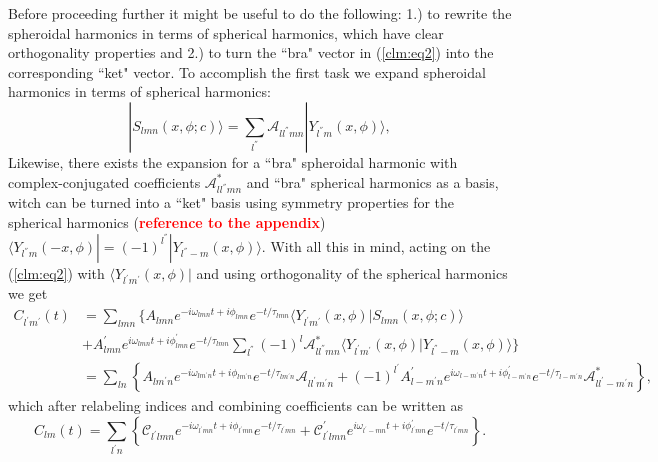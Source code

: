 \documentclass[10pt]{article}
\newcommand{\bra}[1]{\langle #1|}
\newcommand{\ket}[1]{|#1\rangle}
\newcommand{\braket}[2]{\langle #1|#2\rangle}
\begin{document}
\noindent
Before proceeding further it might be useful to do the following: 1.) to rewrite the spheroidal harmonics in terms of spherical harmonics, which have clear orthogonality properties and 2.) to turn the ``bra" vector in (\ref{clm:eq2}) into the corresponding ``ket" vector. To accomplish the first task we expand spheroidal harmonics in terms of spherical harmonics:
\begin{equation}
\ket{S_{lmn}(x, \phi ;c)} = \sum_{l^{''}} \mathcal{A}_{ll^{''}mn} \ket{Y_{l^{''}m}(x, \phi)},
\end{equation}
\noindent
Likewise, there exists the expansion for a ``bra" spheroidal harmonic with complex-conjugated coefficients $\mathcal{A}^{*}_{ll^{''}mn}$ and ``bra" spherical harmonics as a basis, witch can be turned into a ``ket" basis using symmetry properties for the spherical harmonics (\textcolor{red}{\bf reference to the appendix}) $\bra{Y_{l^{''}m}(-x, \phi)} = (-1)^{l^{''}} \ket{Y_{l^{''}-m}(x, \phi)}$. With all this in mind, acting on the (\ref{clm:eq2}) with $\bra{Y_{l^{'}m^{'}}(x, \phi)}$ and using orthogonality of the spherical harmonics we get
\begin{equation}
\begin{aligned} \label{clm:eq3}
C_{l^{'}m^{'}}(t) & = \sum_{lmn} \bigg\{ A_{lmn} e^{-i\omega_{lmn}t+i\phi_{lmn}}e^{-t/\tau_{lmn}} \braket{Y_{l^{'}m^{'}}(x, \phi)}{S_{lmn}(x, \phi ;c)}\\
&+ A^{'}_{lmn} e^{i\omega_{lmn}t+i\phi^{'}_{lmn}}e^{-t/\tau_{lmn}} \sum_{l^{''}} (-1)^l \mathcal{A}^{*}_{ll^{''}mn} \braket{Y_{l^{'}m^{'}}(x, \phi)}{Y_{l^{''}-m}(x, \phi)} \bigg\}\\
& = \sum_{ln} \left \{ A_{lm^{'}n} e^{-i\omega_{lm^{'}n}t+i\phi_{lm^{'}n}}e^{-t/\tau_{lm^{'}n}} \mathcal{A}_{ll^{'}m^{'}n} + (-1)^{l^{'}} A^{'}_{l-m^{'}n} e^{i\omega_{l-m^{'}n}t+i\phi^{'}_{l-m^{'}n}}e^{-t/\tau_{l-m^{'}n}} \mathcal{A}^{*}_{ll^{'}-m^{'}n}  \right \},
\end{aligned}
\end{equation}
which after relabeling indices and combining coefficients can be written as 
\begin{equation}
C_{lm}(t) = \sum_{l^{'}n} \left \{ \mathcal{C}_{l^{'}lmn} e^{-i\omega_{l^{'}mn}t+i\phi_{l^{'}mn}}e^{-t/\tau_{l^{'}mn}} + \mathcal{C}^{'}_{l^{'}lmn} e^{i\omega_{l^{'}-mn}t+i\phi^{'}_{l^{'}mn}}e^{-t/\tau_{l^{'}mn}} \right \}.
\end{equation}
\end{document}
